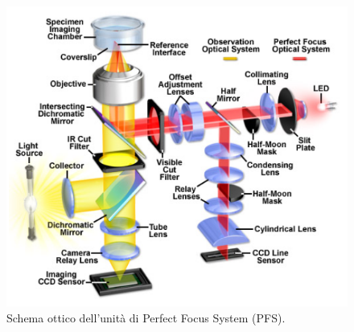 \begin{itemize}
\begin{figure}
 \centering
 \includegraphics[scale=.60]{img/CAP2PFSschema.png}
 \caption{\small{Schema ottico dell'unità di Perfect Focus System (PFS).}}
 \label{fig:PFSschema}
\end{figure}


\end{itemize}
